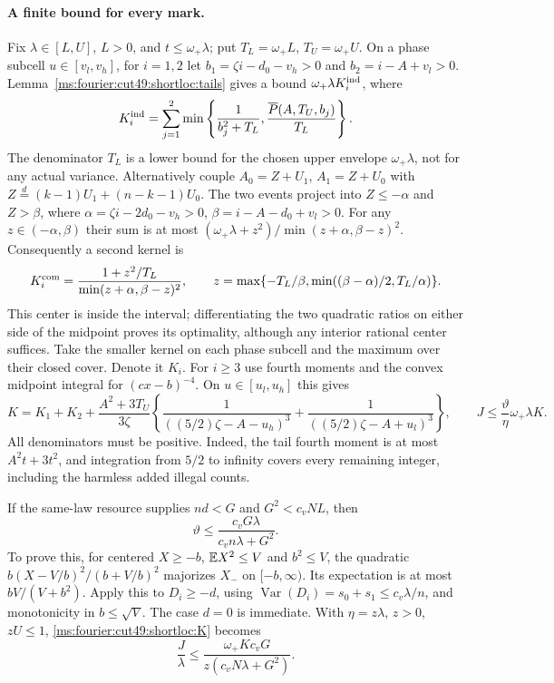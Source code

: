 \paragraph{A finite bound for every mark.}
Fix $\lambda\in[L,U]$, $L>0$, and $t\le\omega_+\lambda$; put
$T_L=\omega_+L$, $T_U=\omega_+U$. On a phase subcell $u\in[v_l,v_h]$,
for $i=1,2$ let $b_1=\zeta i-d_0-v_h>0$ and $b_2=i-A+v_l>0$.
Lemma~\ref{ms:fourier:cut49:shortloc:tails} gives a bound $\omega_+\lambda K_i^{\rm ind}$,
where
\[
 K_i^{\rm ind}=\sum_{j=1}^2\min\left\{\frac1{b_j^2+T_L},
                          \frac{\overline P(A,T_U,b_j)}{T_L}\right\}.
\]
The denominator $T_L$ is a lower bound for the chosen upper envelope
$\omega_+\lambda$, not for any actual variance.
Alternatively couple $A_0=Z+U_1$, $A_1=Z+U_0$ with
$Z\overset d=(k-1)U_1+(n-k-1)U_0$. The two events project into
$Z\le-\alpha$ and $Z>\beta$, where
$\alpha=\zeta i-2d_0-v_h>0$, $\beta=i-A-d_0+v_l>0$.
For any $z\in(-\alpha,\beta)$ their sum is at most
$(\omega_+\lambda+z^2)/\min(z+\alpha,\beta-z)^2$.
Consequently a second kernel is
\[
 K_i^{\rm com}=\frac{1+z^2/T_L}{\min(z+\alpha,\beta-z)^2},\qquad
 z=\max\{-T_L/\beta,\min((\beta-\alpha)/2,T_L/\alpha)\}.
\]
This center is inside the interval; differentiating the two quadratic
ratios on either side of the midpoint proves its optimality, although
any interior rational center suffices. Take the smaller kernel on each
phase subcell and the maximum over their closed cover. Denote it $K_i$.
For $i\ge3$ use fourth moments and the convex midpoint integral for
$(cx-b)^{-4}$. On $u\in[u_l,u_h]$ this gives
\begin{equation}\label{ms:fourier:cut49:shortloc:K}
 K=K_1+K_2+\frac{A^2+3T_U}{3\zeta}
  \left\{\frac1{((5/2)\zeta-A-u_h)^3}
                 +\frac1{((5/2)\zeta-A+u_l)^3}\right\},\qquad
 J\le\frac{\vartheta}{\eta}\omega_+\lambda K.
\end{equation}
All denominators must be positive. Indeed, the tail fourth moment is at
most $A^2t+3t^2$, and integration from $5/2$ to infinity covers every
remaining integer, including the harmless added illegal counts.

If the same-law resource supplies $nd<G$ and
$G^2<c_vNL$, then
\begin{equation}\label{ms:fourier:cut49:shortloc:theta}
 \vartheta\le\frac{c_vG\lambda}{c_vn\lambda+G^2}.
\end{equation}
To prove this, for centered $X\ge-b$, $\mathbb E X^2\le V$ and $b^2\le V$,
the quadratic $b(X-V/b)^2/(b+V/b)^2$ majorizes $X_-$ on $[-b,\infty)$.
Its expectation is at most $bV/(V+b^2)$. Apply this to $D_i\ge-d$,
using $\operatorname{Var}(D_i)=s_0+s_1\le c_v\lambda/n$, and monotonicity
in $b\le\sqrt V$. The case $d=0$ is immediate. With $\eta=z\lambda$,
$z>0$, $zU\le1$, \eqref{ms:fourier:cut49:shortloc:K} becomes
\begin{equation}\label{ms:fourier:cut49:shortloc:Jfinal}
 \frac J\lambda\le\frac{\omega_+Kc_vG}{z(c_vN\lambda+G^2)}.
\end{equation}

